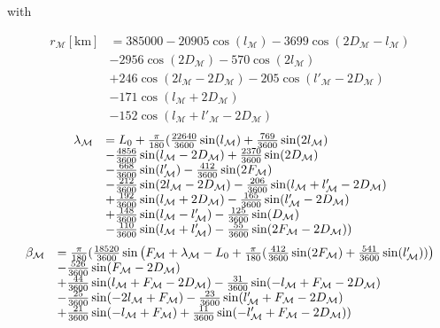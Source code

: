 \documentclass{article}
\begin{document}
with

\begin{equation}
\begin{array}{ll}
r_{{\mathcal M}}[\mbox{km}] &= 385000-20905 \cos(l_{{{\mathcal M}}})-3699 \cos(2 D_{{{\mathcal M}}}-l_{{{\mathcal M}}})\nonumber \\
&-2956 \cos(2 D_{{{\mathcal M}}})-570 \cos(2 l_{{{\mathcal M}}})\\
&+246\cos(2 l_{{{\mathcal M}}}-2 D_{{{\mathcal M}}})-205 \cos(l'_{{{\mathcal M}}}-2 D_{{{\mathcal M}}})\nonumber\\
&-171 \cos(l_{{{\mathcal M}}}+2 D_{{{\mathcal M}}})\nonumber\\
&-152 \cos(l_{{{\mathcal M}}}+l'_{{{\mathcal M}}}-2 D_{{{\mathcal M}}})
\end{array}
\end{equation}
\begin{equation}
\begin{array}{ll}
\begin{array}{ll}
\lambda_{\mathcal M} &= L_0+ \frac{\pi}{180} ( {22640\over 3600} \sin(l_{\mathcal M})
+ {769\over 3600} \sin(2 l_{\mathcal M})\\
&- {4856\over 3600} \sin(l_{\mathcal M} - 2 D_{\mathcal M})
+ {2370\over 3600} \sin(2 D_{\mathcal M})\\
&- {668\over 3600} \sin(l'_{\mathcal M}) - {412\over 3600} \sin(2 F_{\mathcal M})\\
&- {212\over 3600} \sin(2 l_{\mathcal M} - 2 D_{\mathcal M})
- {206\over 3600} \sin(l_{\mathcal M} + l'_{\mathcal M} - 2 D_{\mathcal M})\\
&+ {192\over 3600} \sin(l_{\mathcal M} + 2 D_{\mathcal M})
- {165\over 3600} \sin(l'_{\mathcal M} - 2 D_{\mathcal M})\\
&+ {148\over 3600} \sin(l_{\mathcal M} - l'_{\mathcal M})
- {125\over 3600} \sin(D_{\mathcal M})\\
&- {110\over 3600} \sin(l_{\mathcal M} + l'_{\mathcal M})
- {55\over 3600} \sin(2 F_{\mathcal M} - 2 D_{\mathcal M}) )
\end{array}
\end{array}
\end{equation}
\begin{equation}
\begin{array}{ll}
\beta_{{\mathcal M}} &= \frac{\pi}{180} ( {18520\over 3600} \sin\left(F_{{\mathcal M}}
+ \lambda_{{\mathcal M}}-L_0 + \frac{\pi}{180} ( {412\over 3600} \sin(2F_{{\mathcal M}})
+ {541\over 3600} \sin(l'_{{\mathcal M}})) \right)\\
&- {526\over 3600} \sin(F_{{\mathcal M}} - 2D_{{\mathcal M}})\\
&+ {44\over 3600} \sin(l_{{\mathcal M}} + F_{{\mathcal M}} - 2D_{{\mathcal M}})
- {31\over 3600} \sin(-l_{{\mathcal M}} + F_{{\mathcal M}} - 2D_{{\mathcal M}})\\
&- {25\over 3600} \sin(-2l_{{\mathcal M}} + F_{\mathcal M})
- {23\over 3600} \sin(l'_{\mathcal M}
+ F_{\mathcal M} - 2D_{\mathcal M})\\
&+ {21\over 3600} \sin(-l_{\mathcal M} + F_{\mathcal M})
+ {11\over 3600} \sin(-l'_{\mathcal M} + F_{\mathcal M} - 2D_{\mathcal M}) )
\end{array}
\end{equation}
\end{document}
